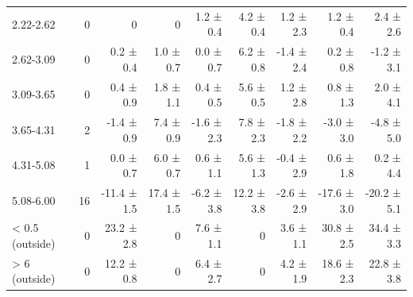 \begin{table}[htbp]
\begin{tabular}{lrrrrrrrr}
2.22-2.62 & 0 & 0 & 0 & 1.2 ± 0.4 & 4.2 ± 0.4 & 1.2 ± 2.3 & 1.2 ± 0.4 & 2.4 ± 2.6 \\
2.62-3.09 & 0 & 0.2 ± 0.4 & 1.0 ± 0.7 & 0.0 ± 0.7 & 6.2 ± 0.8 & -1.4 ± 2.4 & 0.2 ± 0.8 & -1.2 ± 3.1 \\
3.09-3.65 & 0 & 0.4 ± 0.9 & 1.8 ± 1.1 & 0.4 ± 0.5 & 5.6 ± 0.5 & 1.2 ± 2.8 & 0.8 ± 1.3 & 2.0 ± 4.1 \\
3.65-4.31 & 2 & -1.4 ± 0.9 & 7.4 ± 0.9 & -1.6 ± 2.3 & 7.8 ± 2.3 & -1.8 ± 2.2 & -3.0 ± 3.0 & -4.8 ± 5.0 \\
4.31-5.08 & 1 & 0.0 ± 0.7 & 6.0 ± 0.7 & 0.6 ± 1.1 & 5.6 ± 1.3 & -0.4 ± 2.9 & 0.6 ± 1.8 & 0.2 ± 4.4 \\
5.08-6.00 & 16 & -11.4 ± 1.5 & 17.4 ± 1.5 & -6.2 ± 3.8 & 12.2 ± 3.8 & -2.6 ± 2.9 & -17.6 ± 3.0 & -20.2 ± 5.1 \\
< 0.5 (outside) & 0 & 23.2 ± 2.8 & 0 & 7.6 ± 1.1 & 0 & 3.6 ± 1.1 & 30.8 ± 2.5 & 34.4 ± 3.3 \\
> 6 (outside) & 0 & 12.2 ± 0.8 & 0 & 6.4 ± 2.7 & 0 & 4.2 ± 1.9 & 18.6 ± 2.3 & 22.8 ± 3.8 \\
\bottomrule
\end{tabular}
\end{table}
